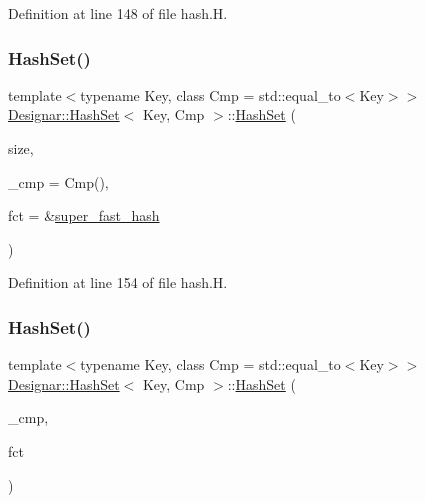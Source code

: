Definition at line 148 of file hash.\+H.

\mbox{\label{class_designar_1_1_hash_set_a007cbe70f94c249ccebaf68006bbf0f4}} 
\subsubsection{\texorpdfstring{Hash\+Set()}{HashSet()}\hspace{0.1cm}{\footnotesize\ttfamily [5/12]}}
{\footnotesize\ttfamily template$<$typename Key, class Cmp = std\+::equal\+\_\+to$<$\+Key$>$$>$ \\
\hyperlink{class_designar_1_1_hash_set}{Designar\+::\+Hash\+Set}$<$ Key, Cmp $>$\+::\hyperlink{class_designar_1_1_hash_set}{Hash\+Set} (\begin{DoxyParamCaption}\item[{\hyperlink{namespace_designar_aa72662848b9f4815e7bf31a7cf3e33d1}{nat\+\_\+t}}]{size,  }\item[{Cmp \&\&}]{\+\_\+cmp = {\ttfamily Cmp()},  }\item[{\hyperlink{class_designar_1_1_hash_set_a7a8b0a4970519ebc9ccc1ad247d0639f}{Hash\+Fct\+Ptr}}]{fct = {\ttfamily \&\hyperlink{namespace_designar_afd5712d16b3ae1c1c7d59f1004cd96fd}{super\+\_\+fast\+\_\+hash}} }\end{DoxyParamCaption})\hspace{0.3cm}{\ttfamily [inline]}}



Definition at line 154 of file hash.\+H.

\mbox{\label{class_designar_1_1_hash_set_a12dce6e775ae60019e189297040e2cbf}} 
\subsubsection{\texorpdfstring{Hash\+Set()}{HashSet()}\hspace{0.1cm}{\footnotesize\ttfamily [6/12]}}
{\footnotesize\ttfamily template$<$typename Key, class Cmp = std\+::equal\+\_\+to$<$\+Key$>$$>$ \\
\hyperlink{class_designar_1_1_hash_set}{Designar\+::\+Hash\+Set}$<$ Key, Cmp $>$\+::\hyperlink{class_designar_1_1_hash_set}{Hash\+Set} (\begin{DoxyParamCaption}\item[{Cmp \&}]{\+\_\+cmp,  }\item[{\hyperlink{class_designar_1_1_hash_set_a05d8d111665c25bc17290c01fa299398}{Hash\+Fct\+Type}}]{fct }\end{DoxyParamCaption})\hspace{0.3cm}{\ttfamily [inline]}}



